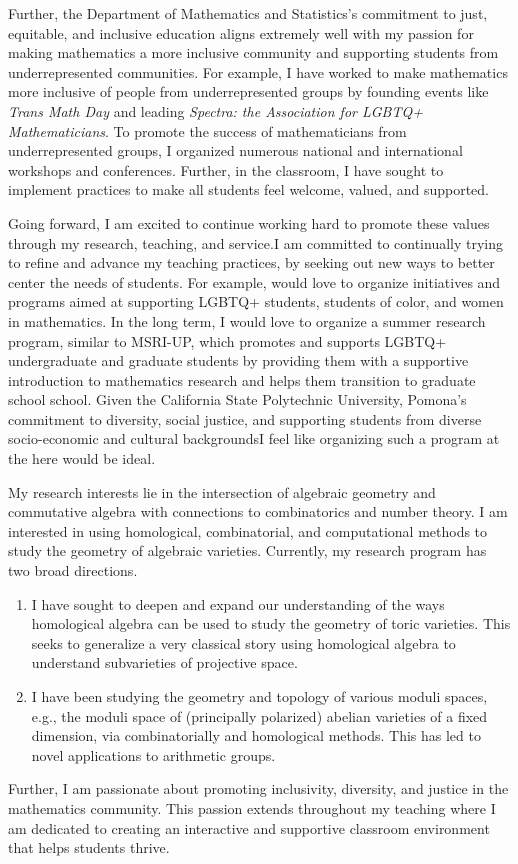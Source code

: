 \documentclass[11pt]{article}
\begin{document}
Further, the Department of Mathematics and Statistics's commitment to just, equitable, and inclusive education aligns extremely well with my passion for making mathematics a more inclusive community and supporting students from underrepresented communities. For example, I have worked to make mathematics more inclusive of people from underrepresented groups by founding events like \textit{Trans Math Day} and leading \textit{Spectra: the Association for LGBTQ+ Mathematicians}. To promote the success of mathematicians from underrepresented groups, I organized numerous national and international workshops and conferences. Further, in the classroom, I have sought to implement practices to make all students feel welcome, valued, and supported. 

Going forward, I am excited to continue working hard to promote these values through my research, teaching, and service.I am committed to continually trying to refine and advance my teaching practices, by seeking out new ways to better center the needs of students. For example, would love to organize initiatives and programs aimed at supporting LGBTQ+ students, students of color, and women in mathematics. In the long term, I would love to organize a summer research program, similar to MSRI-UP, which promotes and supports LGBTQ+ undergraduate and graduate students by providing them with a supportive introduction to mathematics research and helps them transition to graduate school school. Given the California State Polytechnic University, Pomona's commitment to diversity, social justice, and supporting students from diverse socio-economic and cultural backgroundsI feel like organizing such a program at the here would be ideal. 

My research interests lie in the intersection of algebraic geometry and commutative algebra with connections to combinatorics and number theory. I am interested in using homological, combinatorial, and computational methods to study the geometry of algebraic varieties. Currently, my research program has two broad directions.
\begin{enumerate}[leftmargin=*,label=(\roman*)]
\item I have sought to deepen and expand our understanding of the ways homological algebra can be used to study the geometry of toric varieties. This seeks to generalize a very classical story using homological algebra to understand subvarieties of projective space.
\item I have been studying the geometry and topology of various moduli spaces, e.g., the moduli space of (principally polarized) abelian varieties of a fixed dimension, via combinatorially and homological methods. This has led to novel applications to arithmetic groups. 
\end{enumerate}
Further, I am passionate about promoting inclusivity, diversity, and justice in the mathematics community. This passion extends throughout my teaching where I am dedicated to creating an interactive and supportive classroom environment that helps students thrive. 
\end{document}

